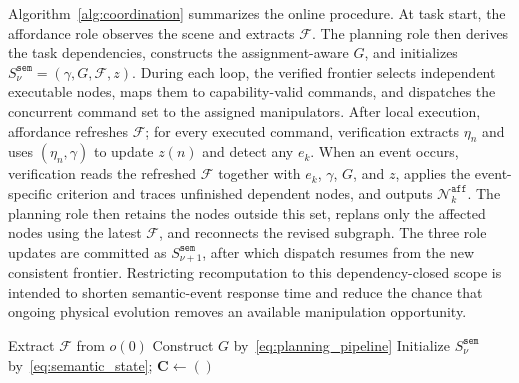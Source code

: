 Algorithm~\ref{alg:coordination} summarizes the online procedure. At task start,
the affordance role observes the scene and extracts $\mathcal{F}$. The planning
role then derives the task dependencies, constructs the assignment-aware $G$,
and initializes $S_\nu^{\texttt{sem}}=(\gamma,G,\mathcal{F},z)$. During each
loop, the verified frontier selects independent executable nodes, maps them to
capability-valid commands, and dispatches the concurrent command set to the
assigned manipulators. After local execution, affordance refreshes
$\mathcal{F}$; for every executed command, verification extracts $\eta_n$ and
uses $(\eta_n,\gamma)$ to update $z(n)$ and detect any $e_k$. When an event
occurs, verification reads the refreshed $\mathcal{F}$ together with
$e_k$, $\gamma$, $G$, and $z$, applies the event-specific criterion and traces
unfinished dependent nodes, and outputs $\mathcal{N}_k^{\texttt{aff}}$. The
planning role then retains the nodes outside this set, replans only the affected
nodes using the latest $\mathcal{F}$, and reconnects the revised subgraph. The
three role updates are committed as $S_{\nu+1}^{\texttt{sem}}$, after which
dispatch resumes from the new consistent frontier. Restricting recomputation to this
dependency-closed scope is intended to shorten semantic-event response time and
reduce the chance that ongoing physical evolution removes an available
manipulation opportunity.

\begin{algorithm}[t!]
\caption{Online role-shared semantic coord.}
\label{alg:coordination}

Extract $\mathcal{F}$ from $o(0)$\;
Construct $G$ by~\eqref{eq:planning_pipeline}\;
Initialize $S_\nu^{\texttt{sem}}$ by~\eqref{eq:semantic_state};
$\mathbf{C}\gets()$\;

\end{algorithm}

